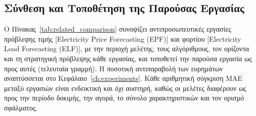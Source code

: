 \begin{landscape}
\thispagestyle{empty}%
\noindent\hfill\thepage          %
\par\vspace{2pt}

\section{Σύνθεση και Τοποθέτηση της Παρούσας Εργασίας}
\label{sec:lit_positioning}

Ο Πίνακας~\ref{tab:related_comparison} συνοψίζει αντιπροσωπευτικές εργασίες πρόβλεψης
τιμής [Electricity Price Forecasting (EPF)] και φορτίου [Electricity Load Forecasting
(ELF)], με την περιοχή μελέτης, τους αλγόριθμους, τον ορίζοντα και τη στρατηγική
πρόβλεψης κάθε εργασίας, και τοποθετεί την παρούσα εργασία ως προς αυτές (τελευταία
γραμμή). Η ποσοτική αντιπαραβολή των ευρημάτων αναπτύσσεται στο
Κεφάλαιο~\ref{ch:experiments}. Κάθε αριθμητική σύγκριση MAE μεταξύ εργασιών είναι
ενδεικτική και όχι αυστηρή, καθώς οι μελέτες διαφέρουν ως προς την περίοδο δοκιμής,
την αγορά, το σύνολο χαρακτηριστικών και τον ορισμό σφάλματος.


\end{landscape}
